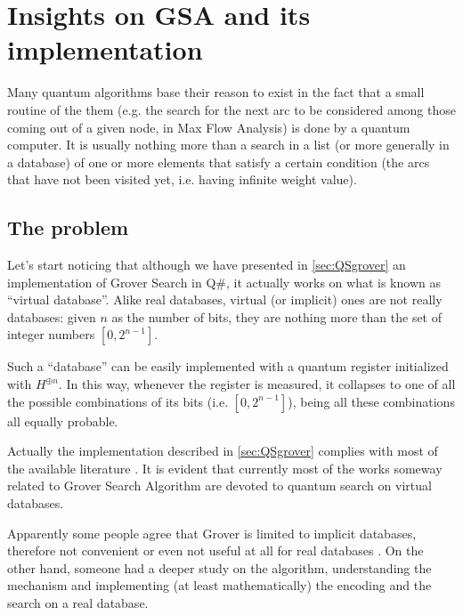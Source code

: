 
\chapter{Insights on GSA and its implementation}
\label{chp:grover}

Many quantum algorithms base their reason to exist in the fact that a small routine of the them (e.g. the search for the next arc to be considered among those coming out of a given node, in Max Flow Analysis) is done by a quantum computer. It is usually nothing more than a search in a list (or more generally in a database) of one or more elements that satisfy a certain condition (the arcs that have not been visited yet, i.e. having infinite weight value).

\section{The problem}

Let's start noticing that although we have presented in \cref{sec:QSgrover} an implementation of Grover Search in Q\#, it actually works on what is known as ``virtual database''. Alike real databases, virtual (or implicit) ones are not really databases: given $n$ as the number of bits, they are nothing more than the set of integer numbers $\left[0, 2^{n-1}\right]$.

Such a ``database'' can be easily implemented with a quantum register initialized with $H^{\oplus n}$. In this way, whenever the register is measured, it collapses to one of all the possible combinations of its bits (i.e. $\left[0, 2^{n-1}\right]$), being all these combinations all equally probable.

\bigskip

Actually the implementation described in \cref{sec:QSgrover} complies with most of the available literature \cite{Grover:1996:FQM:237814.237866, lavor2003grover}. It is evident that currently most of the works someway related to Grover Search Algorithm are devoted to quantum search on virtual databases. \cite{Broda2016}

\bigskip

Apparently some people agree that Grover is limited to implicit databases, therefore not convenient or even not useful at all for real databases \cite{1425397, Zalka2000, stackexchange1, stackexchange2, stackexchange3}. On the other hand, someone had a deeper study on the algorithm, understanding the mechanism and implementing (at least mathematically) the encoding and the search on a real database. \cite{alsing2011grover}

